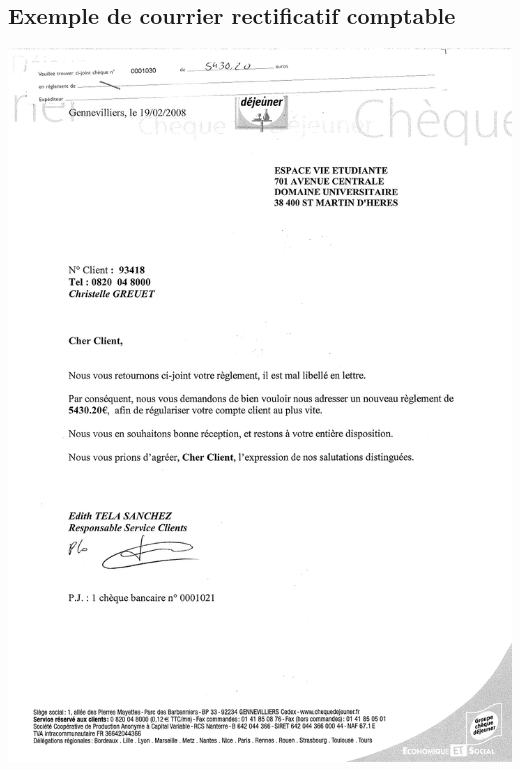 \subsection{Exemple de courrier rectificatif comptable}
\begin{center}
\includegraphics[scale=0.7]{annexes/images/chequedejeuner_erreur.pdf}
\end{center}
